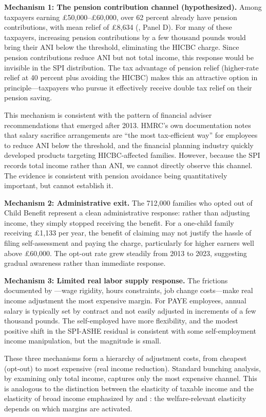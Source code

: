\documentclass[12pt]{article}
\begin{document}
\textbf{Mechanism 1: The pension contribution channel (hypothesized).} Among taxpayers earning \pounds50,000--\pounds60,000, over 62 percent already have pension contributions, with mean relief of \pounds8,634 (, Panel D). For many of these taxpayers, increasing pension contributions by a few thousand pounds would bring their ANI below the threshold, eliminating the HICBC charge. Since pension contributions reduce ANI but not total income, this response would be invisible in the SPI distribution. The tax advantage of pension relief (higher-rate relief at 40 percent plus avoiding the HICBC) makes this an attractive option in principle---taxpayers who pursue it effectively receive double tax relief on their pension saving.

This mechanism is consistent with the pattern of financial adviser recommendations that emerged after 2013. HMRC's own documentation notes that salary sacrifice arrangements are ``the most tax-efficient way'' for employees to reduce ANI below the threshold, and the financial planning industry quickly developed products targeting HICBC-affected families. However, because the SPI records total income rather than ANI, we cannot directly observe this channel. The evidence is consistent with pension avoidance being quantitatively important, but cannot establish it.

\textbf{Mechanism 2: Administrative exit.} The 712,000 families who opted out of Child Benefit represent a clean administrative response: rather than adjusting income, they simply stopped receiving the benefit. For a one-child family receiving \pounds1,133 per year, the benefit of claiming may not justify the hassle of filing self-assessment and paying the charge, particularly for higher earners well above \pounds60,000. The opt-out rate grew steadily from 2013 to 2023, suggesting gradual awareness rather than immediate response.

\textbf{Mechanism 3: Limited real labor supply response.} The frictions documented by \citet{chetty2011}---wage rigidity, hours constraints, job change costs---make real income adjustment the most expensive margin. For PAYE employees, annual salary is typically set by contract and not easily adjusted in increments of a few thousand pounds. The self-employed have more flexibility, and the modest positive shift in the SPI-ASHE residual is consistent with some self-employment income manipulation, but the magnitude is small.

These three mechanisms form a hierarchy of adjustment costs, from cheapest (opt-out) to most expensive (real income reduction). Standard bunching analysis, by examining only total income, captures only the most expensive channel. This is analogous to the distinction between the elasticity of taxable income and the elasticity of broad income emphasized by \citet{kopczuk2005} and \citet{chetty2009}: the welfare-relevant elasticity depends on which margins are activated.
\end{document}
